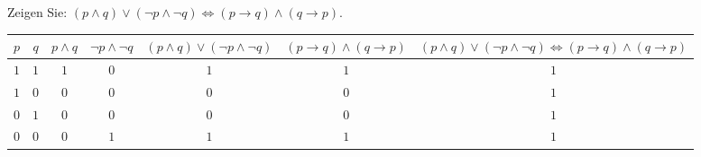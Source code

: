
\begin{exercise}[19]

Zeigen Sie:
$(p \land q) \lor (\neg p \land \neg q) \Leftrightarrow (p \to q) \land (q \to p)$.

\end{exercise}


\begin{solution}
\begin{tabular}{|c|c|c|c|c|c|c|}
\hline
$p$ & $q$ & $p \land q$ & $\neg p \land \neg q$ & $(p \land q) \lor (\neg p \land \neg q)$ & $(p \to q) \land (q \to p)$
& $(p \land q) \lor (\neg p \land \neg q) \Leftrightarrow (p \to q) \land (q \to p)$\\
\hline
$1$ & $1$ & $1$ & $0$ & $1$ & $1$ & $1$\\
\hline
$1$ & $0$ & $0$ & $0$ & $0$ & $0$ & $1$\\
\hline
$0$ & $1$ & $0$ & $0$ & $0$ & $0$ & $1$\\
\hline
$0$ & $0$ & $0$ & $1$ & $1$ & $1$ & $1$\\
\hline
\end{tabular}

\end{solution}

